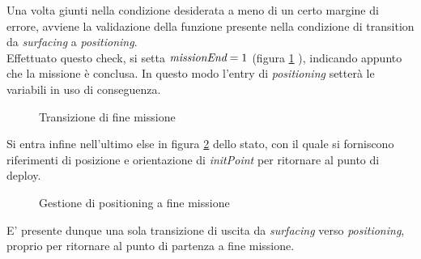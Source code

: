 \documentclass{article}
\begin{document}
            Una volta giunti nella condizione desiderata a meno di un certo margine di errore, avviene 
            la validazione della funzione presente nella condizione di transition da \emph{surfacing} a \emph{positioning}.\\
            Effettuato questo check, si setta $\emph{missionEnd} = 1$ (figura \ref{fig:missend} ), indicando appunto che 
            la missione è conclusa. In questo modo l'entry di \emph{positioning} setterà le variabili in uso di conseguenza.

            \begin{figure} [ht]
                \caption{Transizione di fine missione}
                \label{fig:missend}
            \end{figure}

            Si entra infine nell'ultimo else in figura \ref{fig:else} dello stato, con il quale si forniscono riferimenti di posizione e orientazione di \emph{initPoint} 
            per ritornare al punto di deploy.

            \begin{figure} [ht]
                \caption{Gestione di positioning a fine missione}
                \label{fig:else}
            \end{figure}

            E' presente dunque una sola transizione di uscita da \emph{surfacing} verso \emph{positioning}, proprio per ritornare al punto di partenza a fine missione.

\end{document}
